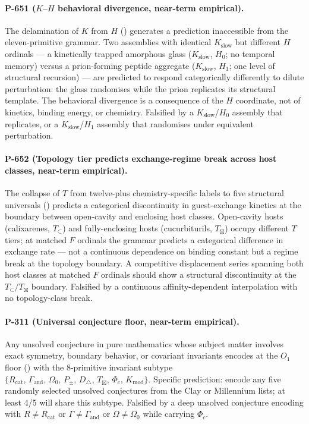 \documentclass[12pt,a4paper]{article}
\newcommand{\Phic}{\Phi_c}
\newcommand{\Tin}{T_{\mathord{\subset}}}
\newcommand{\Tbox}{T_{\mathord{\boxtimes}}}
\begin{document}
\paragraph{P-651 ($K$--$H$ behavioral divergence, near-term empirical).}
The delamination of $K$ from $H$ () generates a
prediction inaccessible from the eleven-primitive grammar. Two assemblies with
identical $K_{\text{slow}}$ but different $H$ ordinals --- a kinetically trapped
amorphous glass ($K_{\text{slow}}$, $H_0$; no temporal memory) versus a
prion-forming peptide aggregate ($K_{\text{slow}}$, $H_1$; one level of
structural recursion) --- are predicted to respond categorically differently to
dilute perturbation: the glass randomises while the prion replicates its
structural template. The behavioral divergence is a consequence of the $H$
coordinate, not of kinetics, binding energy, or chemistry. Falsified by a
$K_{\text{slow}}$/$H_0$ assembly that replicates, or a $K_{\text{slow}}$/$H_1$
assembly that randomises under equivalent perturbation.

\paragraph{P-652 (Topology tier predicts exchange-regime break across host classes, near-term empirical).}
The collapse of $T$ from twelve-plus chemistry-specific labels to five structural
universals () predicts a categorical discontinuity in
guest-exchange kinetics at the boundary between open-cavity and enclosing host
classes. Open-cavity hosts (calixarenes, $\Tin$) and fully-enclosing hosts
(cucurbiturils, $\Tbox$) occupy different $T$ tiers; at matched $F$ ordinals the
grammar predicts a categorical difference in exchange rate --- not a continuous
dependence on binding constant but a regime break at the topology boundary. A
competitive displacement series spanning both host classes at matched $F$ ordinals
should show a structural discontinuity at the $\Tin / \Tbox$ boundary. Falsified
by a continuous affinity-dependent interpolation with no topology-class break.

\paragraph{P-311 (Universal conjecture floor, near-term empirical).}
Any unsolved conjecture in pure mathematics whose subject matter
involves exact symmetry, boundary behavior, or covariant invariants
encodes at the $O_1$ floor () with the
8-primitive invariant subtype $\{R_\text{cat},\, \Gamma_\text{and},\,
\Omega_0,\, P_\pm,\, D_\triangle,\, T_\boxtimes,\, \Phic,\,
K_\text{mod}\}$. Specific prediction: encode any five randomly selected
unsolved conjectures from the Clay or Millennium lists; at least 4/5
will share this subtype. Falsified by a deep unsolved conjecture
encoding with $R \neq R_\text{cat}$ or $\Gamma \neq \Gamma_\text{and}$
or $\Omega \neq \Omega_0$ while carrying $\Phic$.
\end{document}
